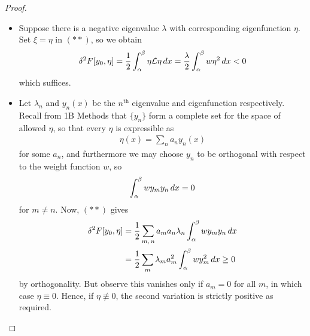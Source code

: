 \documentclass{../../template/note}
\begin{document}
    \begin{proof}
        \begin{itemize}
            \item [$\implies$] Suppose there is a negative eigenvalue $\lambda$ with corresponding eigenfunction $\eta$. Set $\xi = \eta$ in $(**)$, so we obtain
            \begin{align*}
                \delta^2 F[y_0, \eta] = \frac 1 2 \int_\alpha^\beta \eta \mathcal{L} \eta \,d{x} = \frac \lambda 2 \int_\alpha^\beta w\eta^2 \,d{x} < 0
            \end{align*}
            which suffices.    
            \item [$\impliedby$] Let $\lambda_n$ and $y_n(x)$ be the $n^\text{th}$ eigenvalue and eigenfunction respectively. Recall from 1B Methods that $\{y_n\}$ form a complete set for the space of allowed $\eta$, so that every $\eta$ is expressible as
            \begin{align*}
                \eta(x) = \sum_n a_n y_n(x)
            \end{align*}
            for some $a_n$, and furthermore we may choose $y_n$ to be orthogonal with respect to the weight function $w$, so
            \begin{align*}
                \int_\alpha^\beta w y_m y_n \,d{x} = 0
            \end{align*}
            for $m \neq n$. Now, $(**)$ gives
            \begin{align*}
                \delta^2 F[y_0, \eta] &= \frac 1 2 \sum_{m,\, n} a_m a_n \lambda_n \int_\alpha^\beta w y_m y_n \,d{x} \\
                &= \frac 1 2 \sum_m \lambda_m a_m^2 \int_\alpha^\beta wy_m^2 \,d{x} \geq 0
            \end{align*}
            by orthogonality. But observe this vanishes only if $a_m = 0$ for all $m$, in which case $\eta \equiv 0$. Hence, if $\eta \not\equiv 0$, the second variation is strictly positive as required.
        \end{itemize}
    \end{proof}
    
\end{document}
